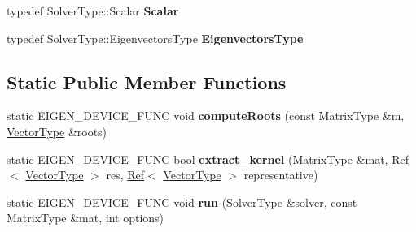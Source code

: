 \begin{DoxyCompactItemize}
typedef Solver\+Type\+::\+Scalar {\bfseries Scalar}
\item 
\mbox{\label{struct_eigen_1_1internal_1_1direct__selfadjoint__eigenvalues_3_01_solver_type_00_013_00_01false_01_4_a871dcddc6a2eccca1440ce2e4ed62b63}} 
typedef Solver\+Type\+::\+Eigenvectors\+Type {\bfseries Eigenvectors\+Type}
\end{DoxyCompactItemize}
\subsection*{Static Public Member Functions}
\begin{DoxyCompactItemize}
\item 
\mbox{\label{struct_eigen_1_1internal_1_1direct__selfadjoint__eigenvalues_3_01_solver_type_00_013_00_01false_01_4_abb216c5ee047da4b4d7b225948b5d666}} 
static E\+I\+G\+E\+N\+\_\+\+D\+E\+V\+I\+C\+E\+\_\+\+F\+U\+NC void {\bfseries compute\+Roots} (const Matrix\+Type \&m, \hyperlink{struct_vector_type}{Vector\+Type} \&roots)
\item 
\mbox{\label{struct_eigen_1_1internal_1_1direct__selfadjoint__eigenvalues_3_01_solver_type_00_013_00_01false_01_4_acd33edc4fec6df2b006ffcdd610f0a3b}} 
static E\+I\+G\+E\+N\+\_\+\+D\+E\+V\+I\+C\+E\+\_\+\+F\+U\+NC bool {\bfseries extract\+\_\+kernel} (Matrix\+Type \&mat, \hyperlink{group___core___module_class_eigen_1_1_ref}{Ref}$<$ \hyperlink{struct_vector_type}{Vector\+Type} $>$ res, \hyperlink{group___core___module_class_eigen_1_1_ref}{Ref}$<$ \hyperlink{struct_vector_type}{Vector\+Type} $>$ representative)
\item 
\mbox{\label{struct_eigen_1_1internal_1_1direct__selfadjoint__eigenvalues_3_01_solver_type_00_013_00_01false_01_4_a9bba7b5bd5aeb6d3ede0cd70ed18f231}} 
static E\+I\+G\+E\+N\+\_\+\+D\+E\+V\+I\+C\+E\+\_\+\+F\+U\+NC void {\bfseries run} (Solver\+Type \&solver, const Matrix\+Type \&mat, int options)
\item 
\mbox{\label{struct_eigen_1_1internal_1_1direct__selfadjoint__eigenvalues_3_01_solver_type_00_013_00_01false_01_4_abb216c5ee047da4b4d7b225948b5d666}} 

\end{DoxyCompactItemize}
